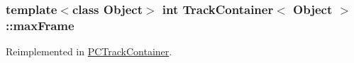 \hypertarget{class_track_container_a095e227d79bf2b5c25412aa983db0f60}{
\subsubsection[{max\-Frame}]{\setlength{\rightskip}{0pt plus 5cm}template$<$class \-Object$>$ int {\bf \-Track\-Container}$<$ \-Object $>$\-::{\bf max\-Frame}}}\label{class_track_container_a095e227d79bf2b5c25412aa983db0f60}


\-Reimplemented in \hyperlink{class_p_c_track_container_afa0c55015d7b49548fa196d3091dacba}{\-P\-C\-Track\-Container}.

